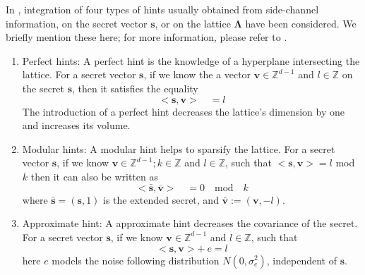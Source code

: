 In \cite{dachman2020lwe}, integration of four types of hints usually obtained from side-channel information, on the secret vector $\textbf{s}$, or on the lattice $\pmb{\Lambda}$ have been considered. We briefly mention these here; for more information, please refer to \cite{dachman2020lwe}.
\begin{enumerate}
    \item Perfect hints: A perfect hint is the knowledge of a hyperplane intersecting the lattice. For a secret vector $\pmb{s}$, if we know the a vector $\pmb{v} \in \mathbb{Z}^{d-1}$ and $l \in \mathbb{Z}$ on the secret $\pmb{s}$, then it satisfies the equality
          \begin{equation*}
              <\textbf{s},\textbf{v}> \quad = l
          \end{equation*}
          The introduction of a perfect hint decreases the lattice's dimension by one and increases its volume.

    \item Modular hints: A modular hint helps to sparsify the lattice. For a secret vector $\pmb{s}$, if we know $\pmb{v} \in \mathbb{Z}^{d-1}; k \in \mathbb{Z}$ and $l \in \mathbb{Z}$, such that $<\textbf{s},\textbf{v}> = l$ mod $k$ then it can also be written as
          \begin{equation*}
              <\bar{\pmb{s}},\bar{\pmb{v}}> \quad = 0 \quad \text{mod}\quad k
          \end{equation*}
          where $\bar{\pmb{s}}=(\pmb{s},1)$ is the extended secret, and $\bar{\pmb{v}}:=(\pmb{v},-l)$.

    \item Approximate hint: A approximate hint decreases the covariance of the secret. For a secret vector $\pmb{s}$, if we know $\pmb{v} \in \mathbb{Z}^{d-1}$ and $l \in \mathbb{Z}$, such that
          \begin{equation*}
              <\pmb{s},\pmb{v}> +\ e = l
          \end{equation*}
          here $e$ models the noise following distribution $N(0,\sigma_e^2)$, independent of $\pmb{s}$.



\end{enumerate}
